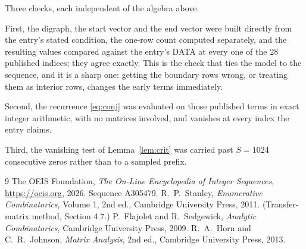 \documentclass[11pt,a4paper]{article}
\theoremstyle{plain}
\theoremstyle{definition}
\begin{document}
Three checks, each independent of the algebra above.

First, the digraph, the start vector and the end vector were built directly from the
entry's stated condition, the one-row count computed separately, and the resulting values
compared against the entry's DATA at every one of the $28$ published indices; they
agree exactly. This is the check that ties the model to the sequence, and it is a sharp one:
getting the boundary rows wrong, or treating them as interior rows, changes the early terms
immediately.

Second, the recurrence \eqref{eq:conj} was evaluated on those published terms in exact
integer arithmetic, with no matrices involved, and vanishes at every index the entry claims.

Third, the vanishing test of Lemma~\ref{lem:crit} was carried past $S=1024$ consecutive
zeros rather than to a sampled prefix.

\begin{thebibliography}{9}
 The OEIS Foundation, \emph{The On-Line Encyclopedia of Integer
Sequences}, \url{https://oeis.org}, 2026. Sequence A305479.
 R.~P.~Stanley, \emph{Enumerative Combinatorics}, Volume 1, 2nd ed.,
Cambridge University Press, 2011. (Transfer-matrix method, Section 4.7.)
 P.~Flajolet and R.~Sedgewick, \emph{Analytic Combinatorics}, Cambridge
University Press, 2009.
 R.~A.~Horn and C.~R.~Johnson, \emph{Matrix Analysis}, 2nd ed., Cambridge
University Press, 2013.
\end{thebibliography}
\end{document}

